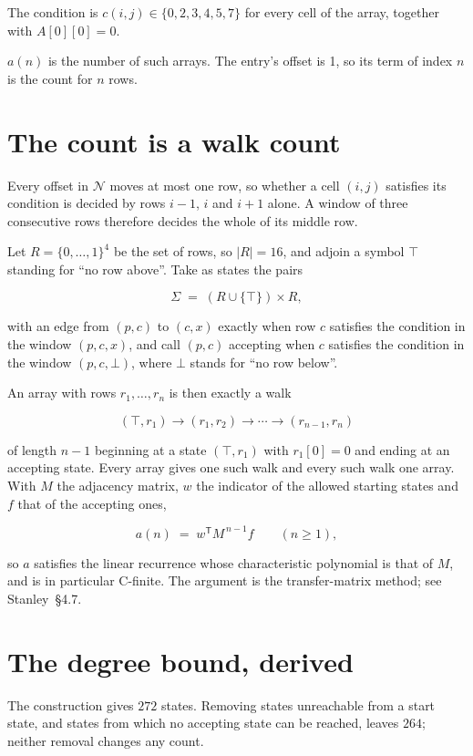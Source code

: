 \documentclass[11pt]{article}
\theoremstyle{definition}
\begin{document}
The condition is $c(i,j) \in \{0, 2, 3, 4, 5, 7\}$ for every cell of the array, together with $A[0][0]=0$.

$a(n)$ is the number of such arrays. The entry's offset is 1, so its term of index $n$ is the count for $n$ rows.

\section{The count is a walk count}

Every offset in $\mathcal{N}$ moves at most one row, so whether a cell $(i,j)$ satisfies its condition is decided by rows $i-1$, $i$ and $i+1$ alone. A window of three consecutive rows therefore decides the whole of its middle row.

Let $R = \{0,\dots,1\}^{4}$ be the set of rows, so $|R| = 16$, and adjoin a symbol $\top$ standing for ``no row above''. Take as states the pairs

\[\Sigma \;=\; (R \cup \{\top\}) \times R,\]

with an edge from $(p,c)$ to $(c,x)$ exactly when row $c$ satisfies the condition in the window $(p,c,x)$, and call $(p,c)$ accepting when $c$ satisfies the condition in the window $(p,c,\bot)$, where $\bot$ stands for ``no row below''.

An array with rows $r_1,\dots,r_n$ is then exactly a walk

\[(\top,r_1) \to (r_1,r_2) \to \cdots \to (r_{n-1},r_n)\]

of length $n-1$ beginning at a state $(\top,r_1)$ with $r_1[0]=0$ and ending at an accepting state. Every array gives one such walk and every such walk one array. With $M$ the adjacency matrix, $w$ the indicator of the allowed starting states and $f$ that of the accepting ones,

\[a(n) \;=\; w^{\mathsf T} M^{\,n-1} f \qquad (n \ge 1),\]

so $a$ satisfies the linear recurrence whose characteristic polynomial is that of $M$, and is in particular C-finite. The argument is the transfer-matrix method; see Stanley~\S4.7.

\section{The degree bound, derived}

The construction gives $272$ states. Removing states unreachable from a start state, and states from which no accepting state can be reached, leaves $264$; neither removal changes any count.
\end{document}
